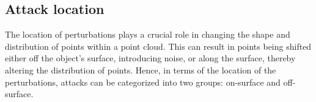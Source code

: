 \documentclass{ieeeaccess}
\begin{document}

\subsection{Attack location}
\label{subsubsec:perturbation location}

The location of perturbations plays a crucial role in changing the shape and distribution of points within a point cloud. This can result in points being shifted either off the object's surface, introducing noise, or along the surface, thereby altering the distribution of points.
Hence, in terms of the location of the perturbations, attacks can be categorized into two groups: on-surface and off-surface.
\end{document}

